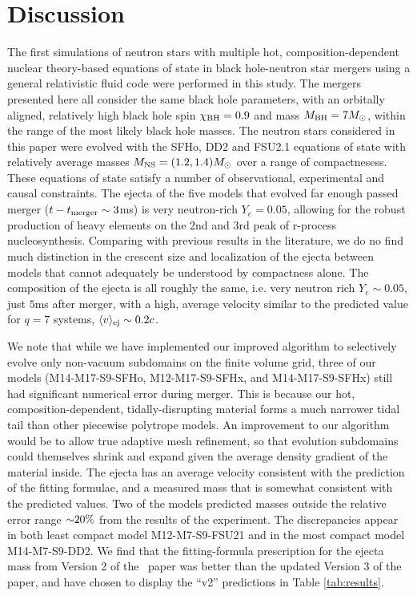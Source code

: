 \section{Discussion}
\label{sec:discussion}

The first simulations of neutron stars with multiple hot, composition-dependent nuclear theory-based equations of state in black hole-neutron star mergers using a general relativistic fluid code were performed in this study.  
The mergers presented here all consider the same black hole parameters, with an orbitally aligned, relatively high black hole spin $\chi_{\rm BH} = 0.9$ and  mass $M_{\rm BH} = 7 M_\odot$, within the range of the most likely black hole masses.  
The neutron stars considered in this paper were evolved with the SFHo, DD2 and FSU2.1 equations of state with relatively average masses $M_{\rm NS} = (1.2,1.4) M_\odot$ over a range of compactnesess.  
These equations of state satisfy a number of observational, experimental and causal constraints.  
The ejecta of the five models that evolved far enough passed merger ($t - t_{\rm merger} \sim 3$ms) is very neutron-rich $Y_e = 0.05$, allowing for the robust production of heavy elements on the 2nd and 3rd peak of r-process nucleosynthesis.
Comparing with previous results in the literature, we do no find much distinction in the crescent size and localization of the ejecta between models that cannot adequately be understood by compactness alone.  The composition of the ejecta is all roughly the same, i.e. very neutron rich $Y_e \sim 0.05$, just $5$ms after merger, with a high, average velocity similar to the predicted value for $q=7$ systems, $\langle v \rangle_{\rm ej} \sim 0.2 c$.

We note that while we have implemented our improved algorithm to selectively evolve only non-vacuum subdomains on the finite volume grid, three of our models (M14-M17-S9-SFHo, M12-M17-S9-SFHx, and M14-M17-S9-SFHx) still had significant numerical error during merger. 
This is because our hot, composition-dependent, tidally-disrupting material forms a much narrower tidal tail than other piecewise polytrope models.
An improvement to our algorithm would be to allow true adaptive mesh refinement, so that evolution subdomains could themselves shrink and expand given the average density gradient of the material inside.
The ejecta has an average velocity consistent with the prediction of the fitting formulae, and a measured mass that is somewhat consistent with the predicted values.
Two of the models predicted masses outside the relative error range $\mathord{\sim}20\%$ from the results of the experiment.
The discrepancies appear in both least compact model M12-M7-S9-FSU21 and in the most compact model M14-M7-S9-DD2.
We find that the fitting-formula prescription for the ejecta mass from Version 2 of the~\cite{Kyutoku:2015} paper was better than the updated Version 3 of the paper, and have chosen to display the ``v2'' predictions in Table \ref{tab:results}.

